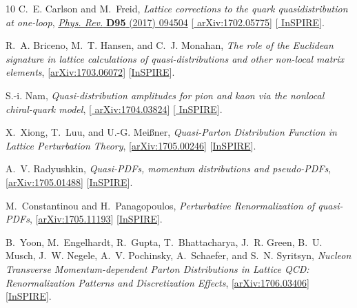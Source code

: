 \begin{thebibliography}{10}
C.~E. Carlson and M.~Freid, {\it {Lattice corrections to the quark
  quasidistribution at one-loop}},
\href{http://dx.doi.org/10.1103/PhysRevD.95.094504}{{\em Phys. Rev.} {\bfseries
  D95} (2017) 094504} [\href{http://arxiv.org/abs/1702.05775}{{\ttfamily
  arXiv:1702.05775}}] [\href{http://inspirehep.net/record/1514254}{{\ttfamily
  InSPIRE}}].

R.~A. Briceno, M.~T. Hansen, and C.~J. Monahan,
{\it {The role of the Euclidean signature in lattice calculations of
  quasi-distributions and other non-local matrix elements}},
  [\href{http://arxiv.org/abs/1703.06072}{{\ttfamily arXiv:1703.06072}}]
  [\href{http://inspirehep.net/record/1518148}{{\ttfamily InSPIRE}}].

S.-i. Nam,
{\it {Quasi-distribution amplitudes for pion and kaon via the nonlocal
  chiral-quark model}},  [\href{http://arxiv.org/abs/1704.03824}{{\ttfamily
  arXiv:1704.03824}}] [\href{http://inspirehep.net/record/1591333}{{\ttfamily
  InSPIRE}}].

X.~Xiong, T.~Luu, and U.-G. Mei{\ss}ner,
{\it {Quasi-Parton Distribution Function in Lattice Perturbation Theory}},
  [\href{http://arxiv.org/abs/1705.00246}{{\ttfamily arXiv:1705.00246}}]
  [\href{http://inspirehep.net/record/1597417}{{\ttfamily InSPIRE}}].

A.~V. Radyushkin,
{\it {Quasi-PDFs, momentum distributions and pseudo-PDFs}},
  [\href{http://arxiv.org/abs/1705.01488}{{\ttfamily arXiv:1705.01488}}]
  [\href{http://inspirehep.net/record/1598042}{{\ttfamily InSPIRE}}].

M.~Constantinou and H.~Panagopoulos,
{\it {Perturbative Renormalization of quasi-PDFs}},
  [\href{http://arxiv.org/abs/1705.11193}{{\ttfamily arXiv:1705.11193}}]
  [\href{http://inspirehep.net/record/1601910}{{\ttfamily InSPIRE}}].

B.~Yoon, M.~Engelhardt, R.~Gupta, T.~Bhattacharya, J.~R. Green, B.~U. Musch,
  J.~W. Negele, A.~V. Pochinsky, A.~Schaefer, and S.~N. Syritsyn,
{\it {Nucleon Transverse Momentum-dependent Parton Distributions in Lattice
  QCD: Renormalization Patterns and Discretization Effects}},
  [\href{http://arxiv.org/abs/1706.03406}{{\ttfamily arXiv:1706.03406}}]
  [\href{http://inspirehep.net/record/1604278}{{\ttfamily InSPIRE}}].


\end{thebibliography}
